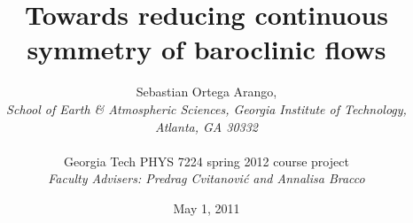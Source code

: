 

        \title{Towards reducing continuous symmetry of baroclinic flows}
        \author{
Sebastian Ortega Arango,
\\
  {\centering\emph{School of Earth \& Atmospheric Sciences,
    Georgia Institute of Technology,
    Atlanta, GA 30332}}
\\\\
Georgia Tech PHYS 7224 spring 2012 course project
\\
\emph{Faculty Advisers: Predrag Cvitanovi\'{c} and Annalisa Bracco}
        }
        \date{
May 1, 2011
        } \Private{\date{\today}}
